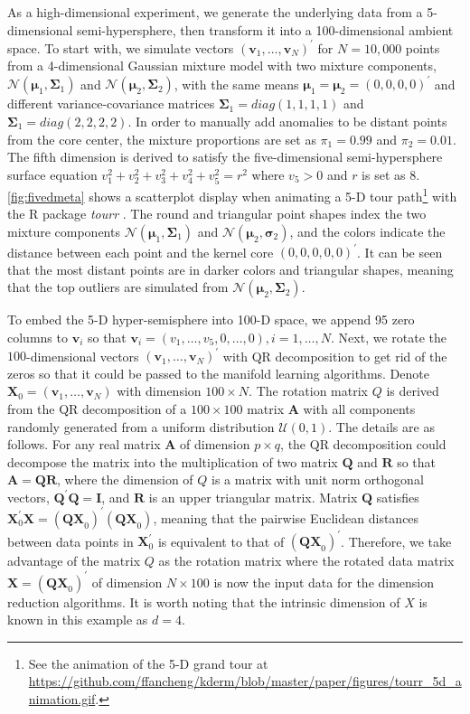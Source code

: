 \documentclass[11pt,a4paper,]{article}
\begin{document}
As a high-dimensional experiment, we generate the underlying data from a 5-dimensional semi-hypersphere, then transform it into a 100-dimensional ambient space. To start with, we simulate vectors \((\pmb{v}_1, \dots, \pmb{v}_N)^\prime\) for \(N=10,000\) points from a 4-dimensional Gaussian mixture model with two mixture components, \(\mathcal{N}(\pmb{\mu}_1, \pmb{\Sigma}_1)\) and \(\mathcal{N}(\pmb{\mu}_2, \pmb{\Sigma}_2)\), with the same means \(\pmb{\mu}_1 = \pmb{\mu}_2 =(0, 0, 0, 0)^\prime\) and different variance-covariance matrices \(\pmb{\Sigma}_1 = diag(1,1,1,1)\) and \(\pmb{\Sigma}_1 = diag(2,2,2,2)\).
In order to manually add anomalies to be distant points from the core center, the mixture proportions are set as \(\pi_1=0.99\) and \(\pi_2=0.01\). The fifth dimension is derived to satisfy the five-dimensional semi-hypersphere surface equation
\(v_1^2 + v_2^2 + v_3^2 + v_4^2 + v_5^2 = r^2\) where \(v_5>0\) and \(r\) is set as \(8\).
\autoref{fig:fivedmeta} shows a scatterplot display when animating a 5-D tour path\footnote{See the animation of the 5-D grand tour at \url{https://github.com/ffancheng/kderm/blob/master/paper/figures/tourr_5d_animation.gif}.} with the R package \emph{tourr} \autocite{Wickham2011-ir}. The round and triangular point shapes index the two mixture components \(\mathcal{N}(\pmb{\mu}_1, \pmb{\Sigma}_1)\) and
\(\mathcal{N}(\pmb{\mu}_2, \pmb{\sigma}_2)\), and the colors indicate the distance between each point and the kernel core \((0, 0, 0, 0, 0)^\prime\). It can be seen that the most distant points are in darker colors and triangular shapes, meaning that the top outliers are simulated from \(\mathcal{N}(\pmb{\mu}_2, \pmb{\Sigma}_2)\).

To embed the 5-D hyper-semisphere into 100-D space, we append 95 zero columns to \(\pmb{v}_i\) so that \(\pmb{v}_i=(v_1, \dots, v_5, 0, \dots, 0), i=1,\dots,N\). Next, we rotate the \(100\)-dimensional vectors \((\pmb{v}_1, \dots, \pmb{v}_N)^\prime\) with QR decomposition to get rid of the zeros so that it could be passed to the manifold learning algorithms. Denote \(\pmb{X}_0 = (\pmb{v}_1, \dots, \pmb{v}_N)\) with dimension \(100 \times N\). The rotation matrix \(Q\) is derived from the QR decomposition of a \(100\times 100\) matrix \(\pmb{A}\) with all components randomly generated from a uniform distribution \(\mathcal{U}(0,1)\). The details are as follows. For any real matrix \(\pmb{A}\) of dimension \(p\times q\), the QR decomposition could decompose the matrix into the multiplication of two matrix \(\pmb{Q}\) and \(\pmb{R}\) so that \(\pmb{A} = \pmb{QR}\), where the dimension of \(Q\) is a matrix with unit norm orthogonal vectors, \(\pmb{Q}^\prime \pmb{Q} = \pmb{I}\), and \(\pmb{R}\) is an upper triangular matrix. Matrix \(\pmb{Q}\) satisfies
\(\pmb{X}_0^\prime \pmb{X}=(\pmb{QX}_0)^\prime(\pmb{QX}_0)\), meaning that the pairwise Euclidean distances between data points in
\(\pmb{X}_0^\prime\) is equivalent to that of \((\pmb{QX}_0)^\prime\).
Therefore, we take advantage of the matrix \(Q\) as the rotation matrix where the rotated data matrix \(\pmb{X} = (\pmb{QX}_0)^\prime\) of dimension \(N \times 100\) is now the input data for the dimension reduction algorithms. It is worth noting that the intrinsic dimension of \(X\) is known in this example as \(d=4\).
\end{document}
